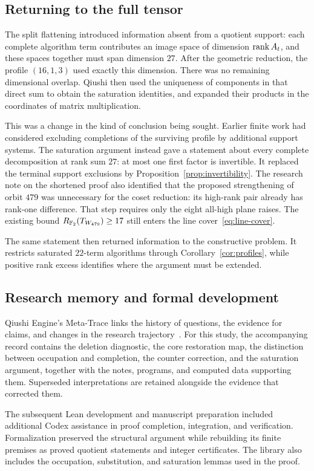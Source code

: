 \subsection{Returning to the full tensor}
The split flattening introduced information absent from a quotient
support: each complete algorithm term contributes an image space of
dimension $\operatorname{rank} A_t$, and these spaces together must span dimension
$27$. After the geometric reduction, the profile $(16,1,3)$ used
exactly this dimension. There was no remaining dimensional overlap.
Qiushi then used the uniqueness of components in that direct sum to
obtain the saturation identities, and expanded their products in the
coordinates of matrix multiplication.

This was a change in the kind of conclusion being sought. Earlier
finite work had considered excluding completions of the surviving
profile by additional support systems. The saturation argument instead
gave a statement about every complete decomposition at rank sum $27$:
at most one first factor is invertible. It replaced the terminal
support exclusions by Proposition~\ref{prop:invertibility}. The
research note on the shortened proof also identified that the proposed
strengthening of orbit $479$ was unnecessary for the coset reduction:
its high-rank pair already has rank-one difference. That step requires
only the eight all-high plane raises. The existing bound
$R_{\mathbb F_2}(T_{W_{479}})\geq17$ still enters the line
cover~\eqref{eq:line-cover}.

The same statement then returned information to the constructive
problem. It restricts saturated $22$-term algorithms through
Corollary~\ref{cor:profiles}, while positive rank excess identifies
where the argument must be extended.

\subsection{Research memory and formal development}
Qiushi Engine's Meta-Trace links the history of questions, the evidence
for claims, and changes in the research trajectory~\cite{qiushi-optics}.
For this study, the accompanying record contains the deletion
diagnostic, the core restoration map,
the distinction between occupation and completion, the counter
correction, and the saturation argument, together with the notes,
programs, and computed data supporting them. Superseded interpretations
are retained alongside the evidence that corrected them.

The subsequent Lean development and manuscript preparation included
additional Codex assistance in proof completion, integration, and
verification. Formalization preserved the structural argument while
rebuilding its finite premises as proved quotient statements and
integer certificates. The library also includes the occupation,
substitution, and saturation lemmas used in the proof.
